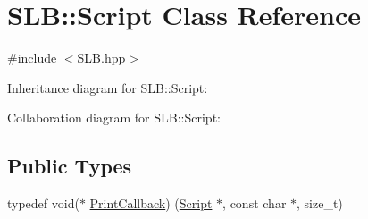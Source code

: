 \hypertarget{classSLB_1_1Script}{}\section{S\+LB\+:\+:Script Class Reference}
\label{classSLB_1_1Script}


{\ttfamily \#include $<$S\+L\+B.\+hpp$>$}



Inheritance diagram for S\+LB\+:\+:Script\+:


Collaboration diagram for S\+LB\+:\+:Script\+:
\subsection*{Public Types}
\begin{DoxyCompactItemize}
\item 
typedef void($\ast$ \hyperlink{classSLB_1_1Script_a2d7bd6aeb062fbf4ee45a73b693f389f}{Print\+Callback}) (\hyperlink{classSLB_1_1Script}{Script} $\ast$, const char $\ast$, size\+\_\+t)
\end{DoxyCompactItemize}
